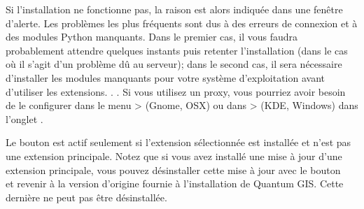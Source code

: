 Si l'installation ne fonctionne pas, la raison est alors indiquée dans une fenêtre d'alerte. Les problèmes les plus fréquents sont dus à des erreurs de connexion et à des modules Python manquants. Dans le premier cas, il vous faudra probablement attendre quelques instants puis retenter l'installation (dans le cas où il s'agit d'un problème dû au serveur); dans le second cas, il sera nécessaire d'installer les modules manquants pour votre système d'exploitation avant d'utiliser les extensions. . . Si vous utilisez un proxy, vous pourriez avoir besoin de le configurer dans le menu  >  (Gnome, OSX) ou dans  >  (KDE, Windows) dans l'onglet .

Le bouton  est actif seulement si l'extension sélectionnée est installée et n'est pas une extension principale. Notez que si vous avez installé une mise à jour d'une extension principale, vous pouvez désinstaller cette mise à jour avec le bouton\\  et revenir à la version d'origine fournie à l'installation de Quantum GIS. Cette dernière ne peut pas être désinstallée.


